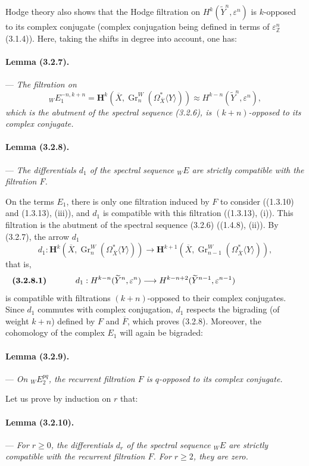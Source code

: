 \documentclass[10pt]{article}
\newcommand{\Z}{\mathbb Z}
\newcommand{\Gr}{\operatorname{Gr}}
\begin{document}
Hodge theory also shows that the Hodge filtration on $H^k(\widetilde Y^n,\varepsilon^n)$ is $k$-opposed to its complex conjugate (complex conjugation being defined in terms of $\varepsilon^n_\Z$ (3.1.4)). Here, taking the shifts in degree into account, one has:

\paragraph{Lemma (3.2.7).} --- {\itshape The filtration on
\[
{}_W E_1^{-n,k+n}
=\mathbf H^k(\overline X,\Gr_n^W(\Omega_{\overline X}^{*}\langle Y\rangle))
\approx H^{k-n}(\widetilde Y^n,\varepsilon^n),
\]
which is the abutment of the spectral sequence (3.2.6), is $(k+n)$-opposed to its complex conjugate.}

\paragraph{Lemma (3.2.8).} --- {\itshape The differentials $d_1$ of the spectral sequence ${}_WE$ are strictly compatible with the filtration $F$.}

On the terms $E_1$, there is only one filtration induced by $F$ to consider ((1.3.10) and (1.3.13), (iii)), and $d_1$ is compatible with this filtration ((1.3.13), (i)). This filtration is the abutment of the spectral sequence (3.2.6) ((1.4.8), (ii)). By (3.2.7), the arrow $d_1$
\[
d_1:\mathbf H^k(\overline X,\Gr_n^W(\Omega_{\overline X}^{*}\langle Y\rangle))
\longrightarrow
\mathbf H^{k+1}(\overline X,\Gr_{n-1}^W(\Omega_{\overline X}^{*}\langle Y\rangle)),
\]
that is,
\[
\makebox[\textwidth][s]{\textbf{(3.2.8.1)}\hfill$\displaystyle d_1:H^{k-n}(\widetilde Y^n,\varepsilon^n)\longrightarrow H^{k-n+2}(\widetilde Y^{n-1},\varepsilon^{n-1})$\hfill\phantom{\textbf{(3.2.8.1)}}}
\]
is compatible with filtrations $(k+n)$-opposed to their complex conjugates. Since $d_1$ commutes with complex conjugation, $d_1$ respects the bigrading (of weight $k+n$) defined by $F$ and $\overline F$, which proves (3.2.8). Moreover, the cohomology of the complex $E_1$ will again be bigraded:

\paragraph{Lemma (3.2.9).} --- {\itshape On ${}_WE_2^{pq}$, the recurrent filtration $F$ is $q$-opposed to its complex conjugate.}

Let us prove by induction on $r$ that:

\paragraph{Lemma (3.2.10).} --- {\itshape For $r\ge0$, the differentials $d_r$ of the spectral sequence ${}_WE$ are strictly compatible with the recurrent filtration $F$. For $r\ge2$, they are zero.}
\end{document}

